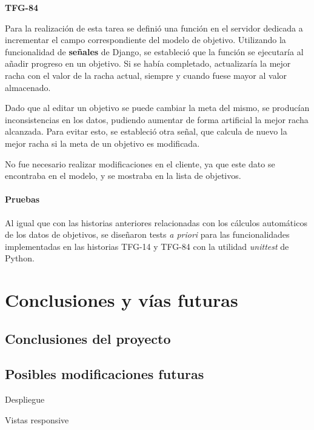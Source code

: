 \documentclass[10pt, a4paper]{aqademic}
\begin{document}
\medskip

\textbf{TFG-84}

Para la realización de esta tarea se definió una función en el servidor dedicada a incrementar el campo correspondiente del modelo de objetivo. Utilizando la funcionalidad de \textbf{señales} \cite{noauthor_signals_nodate} de Django, se estableció que la función se ejecutaría al añadir progreso en un objetivo. Si se había completado, actualizaría la mejor racha con el valor de la racha actual, siempre y cuando fuese mayor al valor almacenado.

Dado que al editar un objetivo se puede cambiar la meta del mismo, se producían inconsistencias en los datos, pudiendo aumentar de forma artificial la mejor racha alcanzada. Para evitar esto, se estableció otra señal, que calcula de nuevo la mejor racha si la meta de un objetivo es modificada.

No fue necesario realizar modificaciones en el cliente, ya que este dato se encontraba en el modelo, y se mostraba en la lista de objetivos.

\medskip

\subsubsection{Pruebas}

Al igual que con las historias anteriores relacionadas con los cálculos automáticos de los datos de objetivos, se diseñaron tests \textit{a priori} para las funcionalidades implementadas en las historias TFG-14 y TFG-84 con la utilidad \textit{unittest} de Python.

\chapter{Conclusiones y vías futuras}



\section{Conclusiones del proyecto}

\section{Posibles modificaciones futuras}

Despliegue 

Vistas responsive
\end{document}
